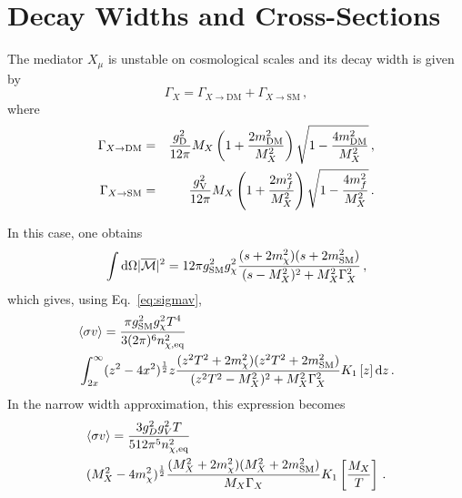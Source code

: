 \documentclass[aps,prd,reprint,twocolumn,preprintnumbers,floatfix,nofootinbib]{revtex4-1}
\newcommand{\be}{\begin{equation}}
\newcommand{\ee}{\end{equation}}
\newcommand{\bea}{\begin{eqnarray}}
\newcommand{\eea}{\end{eqnarray}}
\newcommand{\ba}{\begin{aligned}}
\newcommand{\ea}{\end{aligned}}
\newcommand{\dd}{\text{d}}
\newcommand{\gV}{g_{\rm V}}
\newcommand{\gD}{g_{\rm D}}
\newcommand{\mDM}{m_{\rm DM}}
\begin{document}

\appendix

\section{Decay Widths and Cross-Sections}\label{app:Xsections}
The mediator $X_\mu$ is unstable on cosmological scales and its decay width is given by
\be
\Gamma_X = \Gamma_{X\to \mathrm{DM}}+\Gamma_{X\to \mathrm{SM}}\,,
\ee
where
\bea \label{eq:GamXDM}
\Gamma_{X\to \mathrm{DM}}&=&\frac{\gD^2 }{12\pi}M_X\left(1+\frac{2\mDM^2}{M_X^2}\right)\sqrt{1-\frac{4 \mDM^2}{M_X^2}}\,,\nonumber\\
\Gamma_{X\to \mathrm{SM}}&=&\frac{\gV^2 }{12\pi}M_X\left(1+\frac{2 m_f^2}{M_X^2}\right)\sqrt{1-\frac{4 m_f^2}{M_X^2}}\,.
\eea

In this case, one obtains
\be
\int\dd \Omega |\overline{\mathcal M}|^2 = 12\pi g_{\rm SM}^2g_\chi^2\frac{(s+2m_\chi^2)(s+2 m_{\rm SM}^2)}{(s-M_X^2)^2+M_X^2 \Gamma_X^2}\,,
\ee
which gives, using Eq.~\eqref{eq:sigmav},
\be
\ba
&\langle\sigma v\rangle = \frac{\pi g_{\rm SM}^2g_\chi^2 T^4}{3(2\pi)^6 n_{\chi,\mathrm{eq}}^2} \\
& \int_{2 x}^\infty (z^2-4 x^2)^{\frac{1}{2}} z\frac{(z^2T^2+2 m_\chi^2)(z^2T^2+2 m_{\rm SM}^2)}{(z^2 T^2 - M_X^2)^2+M_X^2 \Gamma_X^2} K_1\left[z\right] \dd z\,.
\ea
\ee
In the narrow width approximation, this expression becomes
\be
\ba
&\langle\sigma v\rangle = \frac{3 g_D^2g_V^2 T}{512 \pi^5 n_{\chi,\mathrm{eq}}^2} \\
&(M_X^2-4 m_\chi^2)^{\frac{1}{2}}\frac{(M_X^2+2 m_\chi^2)(M_X^2+2 m_{\rm SM}^2)}{M_X \Gamma_X} K_1\left[\frac{M_X}{T}\right]\,.
\ea
\ee
\end{document}
